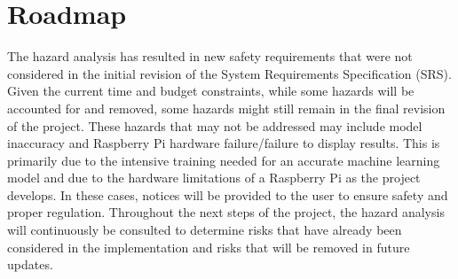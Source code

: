 \documentclass{article}
\begin{document}
\section{Roadmap}
The hazard analysis has resulted in new safety requirements that were not considered in the initial revision of the 
System Requirements Specification (SRS). Given the current time and budget constraints, while some hazards will be accounted 
for and removed, some hazards might still remain in the final revision of the project. These hazards that may not be addressed may include
model inaccuracy and Raspberry Pi hardware failure/failure to display results. This is primarily due to the intensive training needed
for an accurate machine learning model and due to the hardware limitations of a Raspberry Pi as the project develops. In these cases, notices 
will be provided to the user to ensure safety and proper regulation. Throughout the next steps of the project, the hazard analysis will continuously 
be consulted to determine risks that have already been considered in the implementation and risks that will be removed in future updates.
\end{document}
